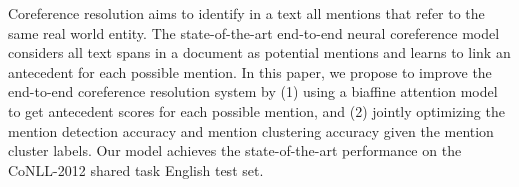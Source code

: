Coreference resolution aims to identify in a text all mentions that refer to the same real world entity. The state-of-the-art end-to-end neural coreference model considers all text spans in a document as potential mentions and learns to link an antecedent for each possible mention. In this paper, we propose to improve the end-to-end coreference resolution system by (1) using a biaffine attention model to get antecedent scores for each possible mention, and (2) jointly optimizing the mention detection accuracy and mention clustering accuracy given the mention cluster labels. Our model achieves the state-of-the-art performance on the CoNLL-2012 shared task English test set.
